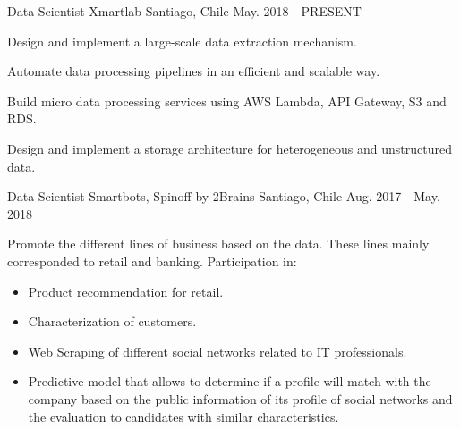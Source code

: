

\begin{cventries}

  \cventry
    {Data Scientist} %
    {Xmartlab} %
    {Santiago, Chile} %
    {May. 2018 - PRESENT} %
    {
      \begin{cvitems} %
        \item {Design and implement a large-scale data extraction mechanism.}
        \item {Automate data processing pipelines in an efficient and scalable way.}
        \item {Build micro data processing services using AWS Lambda, API Gateway, S3 and RDS.}
        \item {Design and implement a storage architecture for heterogeneous and unstructured data.}
        
      \end{cvitems}
    }
  
  \cventry
    {Data Scientist} %
    {Smartbots, Spinoff by 2Brains} %
    {Santiago, Chile} %
    {Aug. 2017 - May. 2018} %
    {
      \begin{cvitems} %
        \item {Promote the different lines of business based on the data. These lines mainly corresponded to retail and banking. Participation in:}
      	\begin{itemize}
        	\item{Product recommendation for retail.}
        	\item{Characterization of customers.}
        	\item{Web Scraping of different social networks related to IT professionals.}
        	\item{Predictive model that allows to determine if a profile will match with the company based on the public information of its profile of social networks and the evaluation to candidates with similar characteristics.}
      	\end{itemize}
      \end{cvitems}
    }


\end{cventries}
